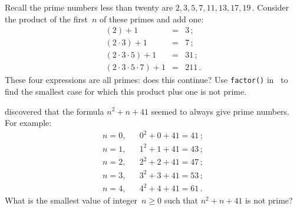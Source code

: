 \begin{draft}
\begin{exercise}  
Recall the prime numbers less than twenty are \(2,3,5,7,11,13,17,19\)\,.
Consider the product of the first~\(n\) of these primes and add one: 
\begin{eqnarray*}
(2)+1&=&3\,;\\
(2\cdot3)+1&=&7\,;\\
(2\cdot3\cdot5)+1&=&31\,;\\
(2\cdot3\cdot5\cdot 7)+1&=&211\,.
\end{eqnarray*}
These four expressions are all primes: does this continue?
Use \verb|factor()| in \script\ to find the smallest case for which this product plus one is not prime.
\end{exercise}




\begin{exercise}  
 discovered that the formula \(n^2+n+41\) seemed to always give prime numbers.
For example:
\begin{eqnarray*}
n=0,&&0^2+0+41=41\,;\\
n=1,&&1^2+1+41=43\,;\\
n=2,&&2^2+2+41=47\,;\\
n=3,&&3^2+3+41=53\,;\\
n=4,&&4^2+4+41=61\,.
\end{eqnarray*}
What is the smallest value of integer~\(n\geq0\) such that \(n^2+n+41\) is not prime?
\end{exercise}






\begin{comment}%
why, what caused X?
how did X occur?
what-if? what-if-not?
how does X compare with Y?
what is the evidence for X?
why is X important?
\end{comment}





\end{draft}

